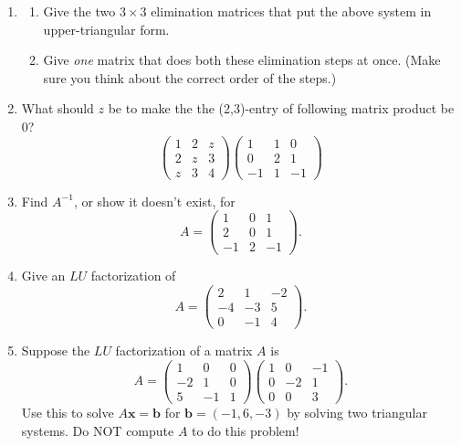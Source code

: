 \documentclass[11pt,fleqn]{article}
\begin{document}
\begin{enumerate}
\vskip 2.5in

\item 
\begin{enumerate}
\item Give the two $3\times3$ elimination matrices that put the above system in upper-triangular form.

\item Give \emph{one} matrix that does both these elimination steps at once. (Make sure you think about the correct order of the steps.)
\end{enumerate}



\item What should $z$ be to make the the  (2,3)-entry of  following  matrix product be $0$?
$$\begin{pmatrix} 1&2&z\\2&z&3\\z&3&4\end{pmatrix}
\begin{pmatrix} 1&1&0\\0&2&1\\-1&1&-1\end{pmatrix}
$$
 

\vskip 1.2in


\item Find $A^{-1}$, or show it doesn't exist, for
$$
A=\begin{pmatrix} 1&0&1\\2&0&1\\-1&2&-1\end{pmatrix}.
$$
 



\item   Give an $LU$ factorization of 
$$A=\begin{pmatrix}2&1&-2\\-4&-3&5\\0&-1&4\end{pmatrix}.$$



\vskip 2.5in


\item Suppose the $LU$ factorization of a matrix $A$ is 
$$A=\begin{pmatrix}1 &0&0\\-2 &1&0\\5&-1&1\end{pmatrix}\begin{pmatrix}1& 0 &-1\\0 &-2&1\\0&0&3\end{pmatrix}.$$
Use this to solve $A\mathbf x =\mathbf b$ for $\mathbf b=(-1,6,-3)$ by solving two triangular systems. Do NOT compute $A$ to do this problem!


\end{enumerate}
\end{document}
